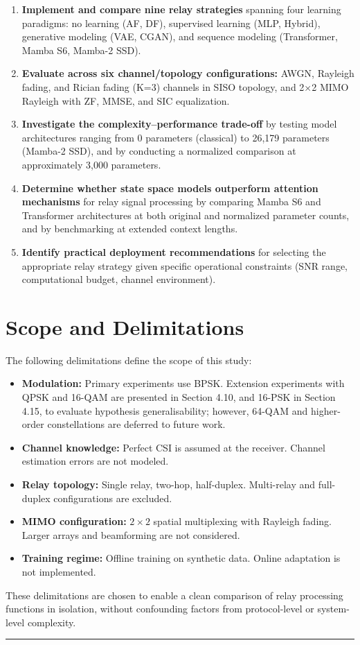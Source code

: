 \begin{enumerate}
\def\labelenumi{\arabic{enumi}.}
\item
  \textbf{Implement and compare nine relay strategies} spanning four learning paradigms: no learning (AF, DF), supervised learning (MLP, Hybrid), generative modeling (VAE, CGAN), and sequence modeling (Transformer, Mamba S6, Mamba-2 SSD).
\item
  \textbf{Evaluate across six channel/topology configurations:} AWGN, Rayleigh fading, and Rician fading (K=3) channels in SISO topology, and 2×2 MIMO Rayleigh with ZF, MMSE, and SIC equalization.
\item
  \textbf{Investigate the complexity--performance trade-off} by testing model architectures ranging from 0 parameters (classical) to 26,179 parameters (Mamba-2 SSD), and by conducting a normalized comparison at approximately 3,000 parameters.
\item
  \textbf{Determine whether state space models outperform attention mechanisms} for relay signal processing by comparing Mamba S6 and Transformer architectures at both original and normalized parameter counts, and by benchmarking at extended context lengths.
\item
  \textbf{Identify practical deployment recommendations} for selecting the appropriate relay strategy given specific operational constraints (SNR range, computational budget, channel environment).
\end{enumerate}

\section{Scope and Delimitations}\label{sec:scope-and-delimitations}

The following delimitations define the scope of this study:

\begin{itemize}
\tightlist
\item
  \textbf{Modulation:} Primary experiments use BPSK. Extension experiments with QPSK and 16-QAM are presented in Section 4.10, and 16-PSK in Section 4.15, to evaluate hypothesis generalisability; however, 64-QAM and higher-order constellations are deferred to future work.
\item
  \textbf{Channel knowledge:} Perfect CSI is assumed at the receiver. Channel estimation errors are not modeled.
\item
  \textbf{Relay topology:} Single relay, two-hop, half-duplex. Multi-relay and full-duplex configurations are excluded.
\item
  \textbf{MIMO configuration:} \(2 \times 2\) spatial multiplexing with Rayleigh fading. Larger arrays and beamforming are not considered.
\item
  \textbf{Training regime:} Offline training on synthetic data. Online adaptation is not implemented.
\end{itemize}

These delimitations are chosen to enable a clean comparison of relay processing functions in isolation, without confounding factors from protocol-level or system-level complexity.

\begin{center}\rule{0.5\linewidth}{0.5pt}\end{center}

